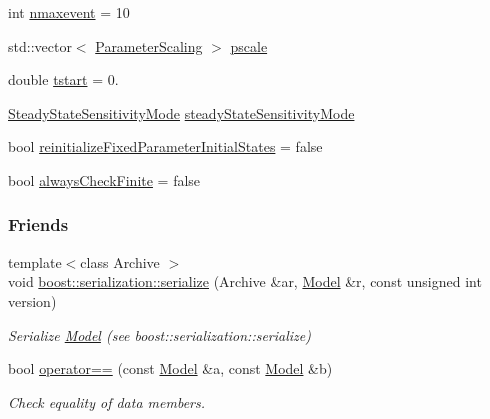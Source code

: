 \begin{DoxyCompactItemize}
\item 
int \mbox{\hyperlink{classamici_1_1_model_aff0f3f25d886279a90dbf0571956885c}{nmaxevent}} = 10
\item 
std\+::vector$<$ \mbox{\hyperlink{namespaceamici_a42f062082226e9284c201d9eab71a3a0}{Parameter\+Scaling}} $>$ \mbox{\hyperlink{classamici_1_1_model_a5d1c7237dc998202fe1b3393b50f77ce}{pscale}}
\item 
double \mbox{\hyperlink{classamici_1_1_model_a514d7e4eb49966fc7d165e0f87fe7f3c}{tstart}} = 0.
\item 
\mbox{\hyperlink{namespaceamici_a1f7d44f04185d57423d01d47d13470a6}{Steady\+State\+Sensitivity\+Mode}} \mbox{\hyperlink{classamici_1_1_model_a27c46c338afef0ba6da6d0695aa5e844}{steady\+State\+Sensitivity\+Mode}}
\item 
bool \mbox{\hyperlink{classamici_1_1_model_a48ac1f2997787adc548bd6bfcec857d5}{reinitialize\+Fixed\+Parameter\+Initial\+States}} = false
\item 
bool \mbox{\hyperlink{classamici_1_1_model_a3ebc8e0e8303452473cee7bbc8eeceb9}{always\+Check\+Finite}} = false
\end{DoxyCompactItemize}
\subsubsection*{Friends}
\begin{DoxyCompactItemize}
\item 
{\footnotesize template$<$class Archive $>$ }\\void \mbox{\hyperlink{classamici_1_1_model_aa81e8ed665213b21092fb9c3fcab18b2}{boost\+::serialization\+::serialize}} (Archive \&ar, \mbox{\hyperlink{classamici_1_1_model}{Model}} \&r, const unsigned int version)
\begin{DoxyCompactList}\small\item\em Serialize \mbox{\hyperlink{classamici_1_1_model}{Model}} (see boost\+::serialization\+::serialize) \end{DoxyCompactList}\item 
bool \mbox{\hyperlink{classamici_1_1_model_ad5a9ae5abc63d6c24c64506c0f9aed6d}{operator==}} (const \mbox{\hyperlink{classamici_1_1_model}{Model}} \&a, const \mbox{\hyperlink{classamici_1_1_model}{Model}} \&b)
\begin{DoxyCompactList}\small\item\em Check equality of data members. \end{DoxyCompactList}\end{DoxyCompactItemize}


